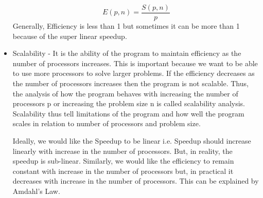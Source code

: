 \documentclass[12pt]{book}
\begin{document}
\begin{itemize}
    \[ E(p,n)=\dfrac{S(p,n)}{p}\]
    Generally, Efficiency is less than 1 but sometimes it can be more than 1 because of the super linear speedup.
    \item Scalability - It is the ability of the program to maintain efficiency as the number of processors increases. This is important because we want to be able to use more processors to solve larger problems. If the efficiency decreases as the number of processors increases then the program is not scalable. 
    Thus, the analysis of how the program behaves with increasing the number of processors p or increasing the problem size n is called scalability analysis. Scalability thus tell limitations of the program and how well the program scales in relation to number of processors and problem size.

    Ideally, we would like the Speedup to be linear i.e. Speedup should increase linearly with increase in the number of processors. But, in reality, the speedup is sub-linear.
    Similarly, we would like the efficiency to remain constant with increase in the number of processors but, in practical it decreases with increase in the number of processors.
    This can be explained by Amdahl's Law.


\end{itemize}
\end{document}
